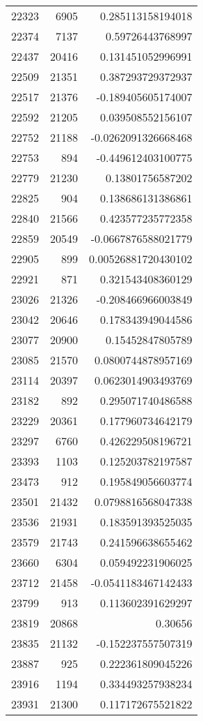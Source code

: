 \begin{tabular}{r | r | r}
22323 & 6905 & 0.285113158194018 \\
22374 & 7137 & 0.59726443768997 \\
22437 & 20416 & 0.131451052996991 \\
22509 & 21351 & 0.387293729372937 \\
22517 & 21376 & -0.189405605174007 \\
22592 & 21205 & 0.039508552156107 \\
22752 & 21188 & -0.0262091326668468 \\
22753 & 894 & -0.449612403100775 \\
22779 & 21230 & 0.13801756587202 \\
22825 & 904 & 0.138686131386861 \\
22840 & 21566 & 0.423577235772358 \\
22859 & 20549 & -0.0667876588021779 \\
22905 & 899 & 0.00526881720430102 \\
22921 & 871 & 0.321543408360129 \\
23026 & 21326 & -0.208466966003849 \\
23042 & 20646 & 0.178343949044586 \\
23077 & 20900 & 0.15452847805789 \\
23085 & 21570 & 0.0800744878957169 \\
23114 & 20397 & 0.0623014903493769 \\
23182 & 892 & 0.295071740486588 \\
23229 & 20361 & 0.177960734642179 \\
23297 & 6760 & 0.426229508196721 \\
23393 & 1103 & 0.125203782197587 \\
23473 & 912 & 0.195849056603774 \\
23501 & 21432 & 0.0798816568047338 \\
23536 & 21931 & 0.183591393525035 \\
23579 & 21743 & 0.241596638655462 \\
23660 & 6304 & 0.059492231906025 \\
23712 & 21458 & -0.0541183467142433 \\
23799 & 913 & 0.113602391629297 \\
23819 & 20868 & 0.30656 \\
23835 & 21132 & -0.152237557507319 \\
23887 & 925 & 0.222361809045226 \\
23916 & 1194 & 0.334493257938234 \\
23931 & 21300 & 0.117172675521822 \\

\end{tabular}
